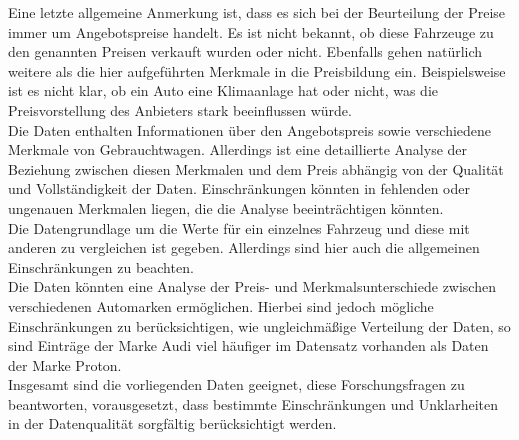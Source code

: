Eine letzte allgemeine Anmerkung ist, dass es sich bei der Beurteilung der Preise immer um Angebotspreise handelt. Es ist nicht bekannt, ob diese Fahrzeuge zu den genannten Preisen verkauft wurden oder nicht. Ebenfalls gehen natürlich weitere als die hier aufgeführten Merkmale in die Preisbildung ein. Beispielsweise ist es nicht klar, ob ein Auto eine Klimaanlage hat oder nicht, was die Preisvorstellung des Anbieters stark beeinflussen würde. \\

Die Daten enthalten Informationen über den Angebotspreis sowie verschiedene Merkmale von Gebrauchtwagen. Allerdings ist eine detaillierte Analyse der Beziehung zwischen diesen Merkmalen und dem Preis abhängig von der Qualität und Vollständigkeit der Daten. Einschränkungen könnten in fehlenden oder ungenauen Merkmalen liegen, die die Analyse beeinträchtigen könnten. \\

Die Datengrundlage um die Werte für ein einzelnes Fahrzeug und diese mit anderen zu vergleichen ist gegeben. Allerdings sind hier auch die allgemeinen Einschränkungen zu beachten. \\

Die Daten könnten eine Analyse der Preis- und Merkmalsunterschiede zwischen verschiedenen Automarken ermöglichen. Hierbei sind jedoch mögliche Einschränkungen zu berücksichtigen, wie ungleichmäßige Verteilung der Daten, so sind Einträge der Marke Audi viel häufiger im Datensatz vorhanden als Daten der Marke Proton. \\

Insgesamt sind die vorliegenden Daten geeignet, diese Forschungsfragen zu beantworten, vorausgesetzt, dass bestimmte Einschränkungen und Unklarheiten in der Datenqualität sorgfältig berücksichtigt werden. \\
